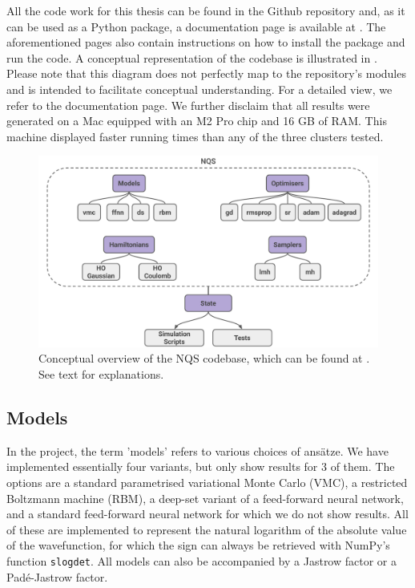 All the code work for this thesis can be found in the Github repository \cite{NQSrepo} and, as it can be used as a Python package, a documentation page is available at \cite{NQSdoc}. The aforementioned pages also contain instructions on how to install the package and run the code. A conceptual representation of the codebase is illustrated in . Please note that this diagram does not perfectly map to the repository's modules and is intended to facilitate conceptual understanding. For a detailed view, we refer to the documentation page. We further disclaim that all results were generated on a Mac equipped with an M2 Pro chip and 16 GB of RAM. This machine displayed faster running times than any of the three clusters tested.


\begin{figure}[H]
    \centering
    \includegraphics[width=\linewidth]{Chapters/Methods/images/codebase_overview.pdf}
    \caption{Conceptual overview of the NQS codebase, which can be found at \cite{NQSrepo}. See text for explanations.}
    \label{fig:nqs_overview}
\end{figure}

\subsection{Models}

In the project, the term 'models' refers to various choices of ansätze. We have implemented essentially four variants, but only show results for 3 of them. The options are a standard parametrised variational Monte Carlo (VMC), a restricted Boltzmann machine (RBM), a deep-set variant of a feed-forward neural network, and a standard feed-forward neural network for which we do not show results. All of these are implemented to represent the natural logarithm of the absolute value of the wavefunction, for which the sign can always be retrieved with NumPy's function \verb|slogdet|. All models can also be accompanied by a Jastrow factor or a Padé-Jastrow factor.

